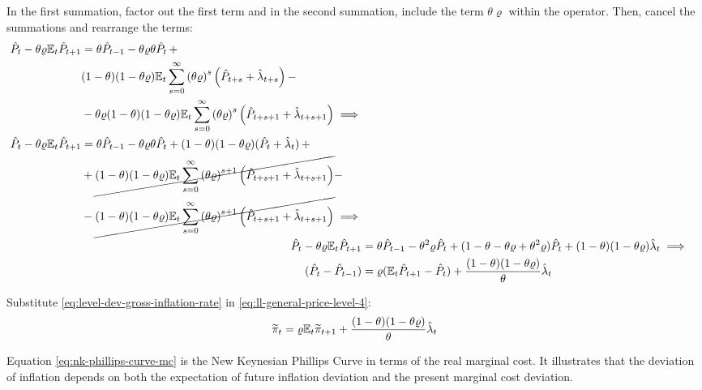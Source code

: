\documentclass[
	thesis.tex
	]{subfiles}
\begin{document}
In the first summation, factor out the first term and in the second summation, include the term $\theta \varrho$ within the operator. Then, cancel the summations and rearrange the terms:
\begin{align}
	\begin{split}
		\hat{P}_t - \theta \varrho {\mathbb{E}_{t}} \hat{P}_{t+1} &= \theta \hat{P}_{t-1} - \theta \varrho \theta \hat{P}_t \, + \\
		& (1-\theta) (1- \theta \varrho) {\mathbb{E}_{t}} \sum_{s=0}^{\infty} \left( \theta \varrho \right)^s \left( \hat{P}_{t+s} + \hat{\lambda}_{t+s} \right) -
		\\
		& - \theta \varrho (1-\theta) (1- \theta \varrho) {\mathbb{E}_{t}} \sum_{s=0}^{\infty} \left( \theta \varrho \right)^s \left( \hat{P}_{t+s+1} + \hat{\lambda}_{t+s+1} \right) \implies \nonumber 
	\end{split} \\
	\begin{split}
		\hat{P}_t - \theta \varrho {\mathbb{E}_{t}} \hat{P}_{t+1} &= \theta \hat{P}_{t-1} - \theta \varrho \theta \hat{P}_t + (1-\theta) (1- \theta \varrho) (\hat{P}_t + \hat{\lambda}_t) \, + 
		\\
		& + \cancel{(1-\theta) (1- \theta \varrho) {\mathbb{E}_{t}} \sum_{s=0}^{\infty} \left( \theta \varrho \right)^{s+1} \left( \hat{P}_{t+s+1} + \hat{\lambda}_{t+s+1} \right)} -
		\\
		& - \cancel{(1-\theta) (1- \theta \varrho) {\mathbb{E}_{t}} \sum_{s=0}^{\infty} \left( \theta \varrho \right)^{s+1} \left( \hat{P}_{t+s+1} + \hat{\lambda}_{t+s+1} \right)} \implies \nonumber 
	\end{split} \\
	\hat{P}_t - \theta \varrho {\mathbb{E}_{t}} \hat{P}_{t+1} &= \theta \hat{P}_{t-1} - \theta^2 \varrho \hat{P}_t + (1- \theta -\theta \varrho + \theta^2 \varrho) \hat{P}_t + (1-\theta) (1- \theta \varrho) \hat{\lambda}_t \implies \nonumber \\
	(\hat{P}_t - \hat{P}_{t-1}) &= \varrho ({\mathbb{E}_{t}} \hat{P}_{t+1} - \hat{P}_t) + \frac{(1-\theta) (1- \theta \varrho)}{\theta} \hat{\lambda}_t
	\label{eq:ll-general-price-level-4}
\end{align}

Substitute \ref{eq:level-dev-gross-inflation-rate} in \ref{eq:ll-general-price-level-4}:
\begin{align}
	\widetilde{\pi}_t = \varrho {\mathbb{E}_{t}} \widetilde{\pi}_{t+1} + \frac{(1-\theta) (1- \theta \varrho)}{\theta} \hat{\lambda}_t \label{eq:nk-phillips-curve-mc}
\end{align}

Equation \ref{eq:nk-phillips-curve-mc} is the New Keynesian Phillips Curve in terms of the real marginal cost. It illustrates that the deviation of inflation depends on both the expectation of future inflation deviation and the present marginal cost deviation.
\end{document}
